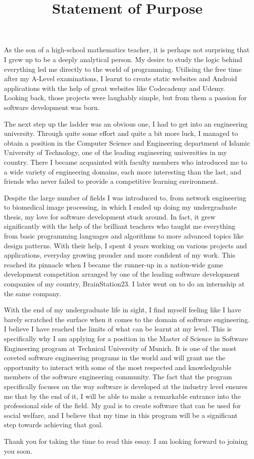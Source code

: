 \documentclass[a4paper, 11pt]{article}
\title{Statement of Purpose}
\author{}
\date{}
\begin{document}
\maketitle

As the son of a high-school mathematics teacher, it is perhaps not surprising that I grew up to be a deeply analytical person. My desire to study the logic behind everything led me directly to the world of programming. Utilising the free time after my A-Level examinations, I learnt to create static websites and Android applications with the help of great websites like Codecademy and Udemy. Looking back, those projects were laughably simple, but from them a passion for software development was born.


The next step up the ladder was an obvious one, I had to get into an engineering university. Through quite some effort and quite a bit more luck, I managed to obtain a position in the Computer Science and Engineering department of Islamic University of Technology, one of the leading engineering universities in my country. There I became acquainted with faculty members who introduced me to a wide variety of engineering domains, each more interesting than the last, and friends who never failed to provide a competitive learning environment.


Despite the large number of fields I was introduced to, from network engineering to biomedical image processing, in which I ended up doing my undergraduate thesis, my love for software development stuck around. In fact, it grew significantly with the help of the brilliant teachers who taught me everything from basic programming languages and algorithms to more advanced topics like design patterns. With their help, I spent 4 years working on various projects and applications, everyday growing prouder and more confident of my work. This reached its pinnacle when I became the runner-up in a nation-wide game development competition arranged by one of the leading software development companies of my country, BrainStation23. I later went on to do an internship at the same company.


With the end of my undergraduate life in sight, I find myself feeling like I have barely scratched the surface when it comes to the domain of software engineering. I believe I have reached the limits of what can be learnt at my level. This is specifically why I am applying for a position in the Master of Science in Software Engineering program at Technical University of Munich. It is one of the most coveted software engineering programs in the world and will grant me the opportunity to interact with some of the most respected and knowledgeable members of the software engineering community. The fact that the program specifically focuses on the way software is developed at the industry level ensures me that by the end of it, I will be able to make a remarkable entrance into the professional side of the field. My goal is to create software that can be used for social welfare, and I believe that my time in this program will be a significant step towards achieving that goal.


Thank you for taking the time to read this essay. I am looking forward to joining you soon.
\end{document}
